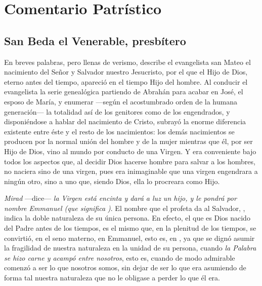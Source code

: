 	
	\newsection

	\section{Comentario Patrístico}
	
		\subsection{San Beda el Venerable, presbítero}
		

			
			\begin{body}
				En breves palabras, pero llenas de verismo, describe el evangelista san Mateo el nacimiento del Señor y Salvador nuestro Jesucristo, por el que el Hijo de Dios, eterno antes del tiempo, apareció en el tiempo Hijo del hombre. Al conducir el evangelista la serie genealógica partiendo de Abrahán para acabar en José, el esposo de María, y enumerar ---según el acostumbrado orden de la humana generación--- la totalidad así de los genitores como de los engendrados, y disponiéndose a hablar del nacimiento de Cristo, subrayó la enorme diferencia existente entre éste y el resto de los nacimientos: los demás nacimientos se producen por la normal unión del hombre y de la mujer mientras que él, por ser Hijo de Dios, vino al mundo por conducto de una Virgen. Y era conveniente bajo todos los aspectos que, al decidir Dios hacerse hombre para salvar a los hombres, no naciera sino de una virgen, pues era inimaginable que una virgen engendrara a ningún otro, sino a uno que, siendo Dios, ella lo procreara como Hijo.
				
				\emph{Mirad} ---dice--- \emph{la Virgen está encinta y dará a luz un hijo, y le pondrá por nombre Emmanuel (que significa )}. El nombre que el profeta da al Salvador, , indica la doble naturaleza de su única persona. En efecto, el que es Dios nacido del Padre antes de los tiempos, es el mismo que, en la plenitud de los tiempos, se convirtió, en el seno materno, en Emmanuel, esto es, en , ya que se dignó asumir la fragilidad de nuestra naturaleza en la unidad de su persona, cuando \emph{la Palabra se hizo carne y acampó entre nosotros}, esto es, cuando de modo admirable comenzó a ser lo que nosotros somos, sin dejar de ser lo que era asumiendo de forma tal nuestra naturaleza que no le obligase a perder lo que él era.
				

\end{body}
